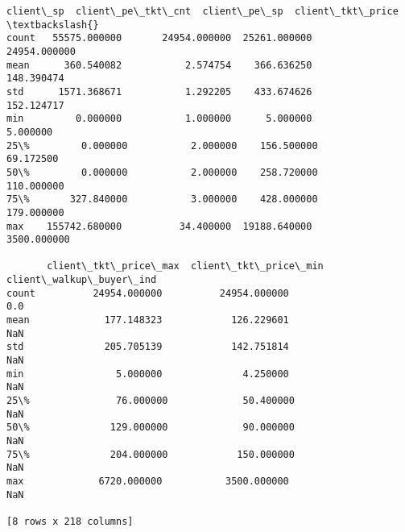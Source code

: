 \documentclass[11pt]{article}
\makeatletter
\newcommand{\boxspacing}{\kern\kvtcb@left@rule\kern\kvtcb@boxsep}
\newcommand{\prompt}[4]{
        {\ttfamily\llap{{\color{#2}[#3]:\hspace{3pt}#4}}\vspace{-\baselineskip}}
    }
\makeatother
\begin{document}
\begin{tcolorbox}[breakable, size=fbox, boxrule=.5pt, pad at break*=1mm, opacityfill=0]
\begin{Verbatim}[commandchars=\\\{\}]
           client\_sp  client\_pe\_tkt\_cnt  client\_pe\_sp  client\_tkt\_price  \textbackslash{}
count   55575.000000       24954.000000  25261.000000      24954.000000
mean      360.540082           2.574754    366.636250        148.390474
std      1571.368671           1.292205    433.674626        152.124717
min         0.000000           1.000000      5.000000          5.000000
25\%         0.000000           2.000000    156.500000         69.172500
50\%         0.000000           2.000000    258.720000        110.000000
75\%       327.840000           3.000000    428.000000        179.000000
max    155742.680000          34.400000  19188.640000       3500.000000

       client\_tkt\_price\_max  client\_tkt\_price\_min  client\_walkup\_buyer\_ind
count          24954.000000          24954.000000                      0.0
mean             177.148323            126.229601                      NaN
std              205.705139            142.751814                      NaN
min                5.000000              4.250000                      NaN
25\%               76.000000             50.400000                      NaN
50\%              129.000000             90.000000                      NaN
75\%              204.000000            150.000000                      NaN
max             6720.000000           3500.000000                      NaN

[8 rows x 218 columns]
\end{Verbatim}
\end{tcolorbox}
        
    \begin{tcolorbox}[breakable, size=fbox, boxrule=1pt, pad at break*=1mm,colback=cellbackground, colframe=cellborder]
\prompt{In}{incolor}{ }{\boxspacing}
\begin{Verbatim}[commandchars=\\\{\}]

\end{Verbatim}
\end{tcolorbox}


    
    
    
\end{document}
